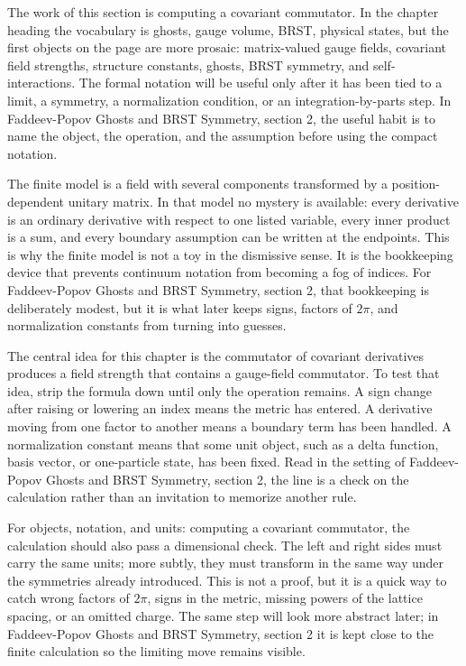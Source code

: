 The work of this section is computing a covariant commutator.  In the chapter heading the vocabulary is ghosts, gauge volume, BRST, physical states, but the first objects on the page are more prosaic: matrix-valued gauge fields, covariant field strengths, structure constants, ghosts, BRST symmetry, and self-interactions.  The formal notation will be useful only after it has been tied to a limit, a symmetry, a normalization condition, or an integration-by-parts step.  In Faddeev-Popov Ghosts and BRST Symmetry, section 2, the useful habit is to name the object, the operation, and the assumption before using the compact notation.

The finite model is a field with several components transformed by a position-dependent unitary matrix.  In that model no mystery is available: every derivative is an ordinary derivative with respect to one listed variable, every inner product is a sum, and every boundary assumption can be written at the endpoints.  This is why the finite model is not a toy in the dismissive sense.  It is the bookkeeping device that prevents continuum notation from becoming a fog of indices.  For Faddeev-Popov Ghosts and BRST Symmetry, section 2, that bookkeeping is deliberately modest, but it is what later keeps signs, factors of \(2\pi\), and normalization constants from turning into guesses.

The central idea for this chapter is the commutator of covariant derivatives produces a field strength that contains a gauge-field commutator.  To test that idea, strip the formula down until only the operation remains.  A sign change after raising or lowering an index means the metric has entered.  A derivative moving from one factor to another means a boundary term has been handled.  A normalization constant means that some unit object, such as a delta function, basis vector, or one-particle state, has been fixed.  Read in the setting of Faddeev-Popov Ghosts and BRST Symmetry, section 2, the line is a check on the calculation rather than an invitation to memorize another rule.

For objects, notation, and units: computing a covariant commutator, the calculation should also pass a dimensional check.  The left and right sides must carry the same units; more subtly, they must transform in the same way under the symmetries already introduced.  This is not a proof, but it is a quick way to catch wrong factors of \(2\pi\), signs in the metric, missing powers of the lattice spacing, or an omitted charge.  The same step will look more abstract later; in Faddeev-Popov Ghosts and BRST Symmetry, section 2 it is kept close to the finite calculation so the limiting move remains visible.

